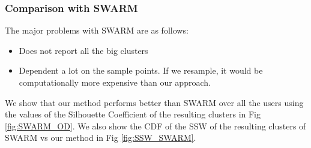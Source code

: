 \subsubsection{Comparison with SWARM}
The major problems with SWARM are as follows: 
\begin{itemize}
\item Does not report all the big clusters
\item Dependent a lot on the sample points. If we resample, it would be computationally more expensive than our approach.
\end{itemize}

We show that our method performs better than SWARM over all the users using the values of the Silhouette Coefficient of the resulting clusters in Fig \ref{fig:SWARM_OD}. We also show the CDF of the SSW of the resulting clusters of SWARM vs our method in Fig \ref{fig:SSW_SWARM}.
